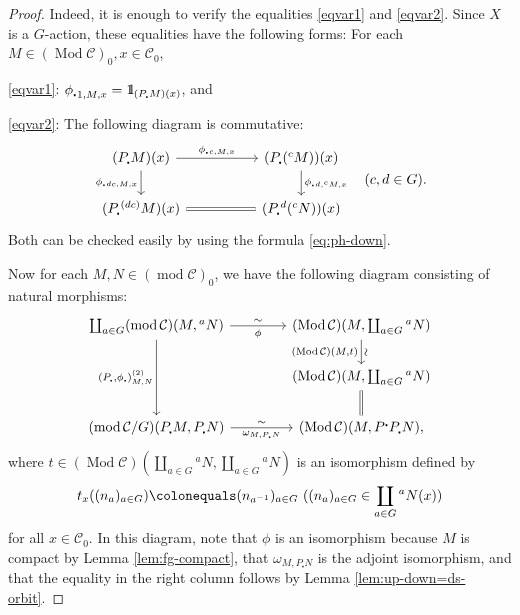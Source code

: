 \documentclass{surv-l}
\numberwithin{equation}{chapter}
\numberwithin{figure}{chapter}
\theoremstyle{plain}
\theoremstyle{definition}
\theoremstyle{remark}
\newcommand{\id}{1\kern-.25em{\text{{\rm l}}}}
\newcommand{\Ar}[3]{\ar[from={#1}, to={#2}, #3]}
\DeclareMathOperator{\Mod}{Mod}
\begin{document}
\begin{proof}
Indeed, it is enough to verify the equalities \eqref{eqvar1} and \eqref{eqvar2}.
Since $X$ is a $G$-action, these equalities have the following forms:
For each $M \in (\Mod{\mathcal{C}})_0, x \in {\mathcal{C}}_0$,

\eqref{eqvar1}: ${\phi_{\centerdot}}_{1,M,x} = \id_{(P_{\centerdot} M)(x)}$, and

\eqref{eqvar2}: The following diagram is commutative:
\[
\begin{tikzcd}[column sep=5em]
(P_{\centerdot} M)(x) & (P_{\centerdot} ({}^{c}M))(x)\\
(P_{\centerdot} {}^{(dc)}M)(x) & (P_{\centerdot} {}^d({}^{c}N))(x)
\Ar{1-1}{1-2}{"{\phi_{\centerdot}{}_{c, M, x}}"}
\Ar{2-1}{2-2}{equal}
\Ar{1-1}{2-1}{"{\phi_{\centerdot}{}_{dc, M, x}}" '}
\Ar{1-2}{2-2}{"{\phi_{\centerdot}{}_{d, {}^cM, x}}"}
\end{tikzcd}
\quad (c, d \in G).
\]
Both can be checked easily by using the formula \eqref{eq:ph-down}.

Now for each $M, N \in (\operatorname{mod} {\mathcal{C}})_0$, we have the following diagram consisting of
natural morphisms:
\begin{equation}\label{eq:comm-precovering}
\begin{tikzcd}[column sep=4em]
\coprod_{a\in G}(\operatorname{mod} {\mathcal{C}})(M, {}^{a}N) &
  (\Mod {\mathcal{C}})(M, \coprod_{a \in G}{}^{a}N)\\
 &   (\Mod {\mathcal{C}})(M, \coprod_{a \in G}{}^{a}N)\\
(\operatorname{mod} {\mathcal{C}}/G)(P_{\centerdot} M, P_{\centerdot} N) &
   (\Mod {\mathcal{C}})(M, P^{\centerdot} P_{\centerdot} N),
\Ar{1-1}{1-2}{"\sim", "\phi" '}
\Ar{3-1}{3-2}{"\sim", "{\omega_{M, P_{\centerdot} N}}" '}
\Ar{1-1}{3-1}{"{(P_{\centerdot}, \phi_{\centerdot})^{(2)}_{M,N}}" '}
\Ar{1-2}{2-2}{"\rotatebox{90}{$\sim$}", "{(\Mod{\mathcal{C}})(M,t)}" '}
\Ar{2-2}{3-2}{equal}
\end{tikzcd}
\end{equation}
where $t \in (\Mod{\mathcal{C}})(\coprod_{a\in G}{}^a N, \coprod_{a\in G}{}^a N)$
is an isomorphism defined by
\[
t_x((n_a)_{a\in G})\colonequals  (n_{a^{-1}})_{a\in G}\ ((n_a)_{a\in G} \in \coprod_{a\in G}{}^a N(x))
\]
for all $x \in {\mathcal{C}}_0$.
In this diagram, note that $\phi$ is an isomorphism because $M$ is compact by Lemma \ref{lem:fg-compact},
that $\omega_{M, P_{\centerdot} N}$ is the adjoint isomorphism, and that
the equality in the right column follows by Lemma \ref{lem:up-down=ds-orbit}.


\end{proof}
\end{document}
